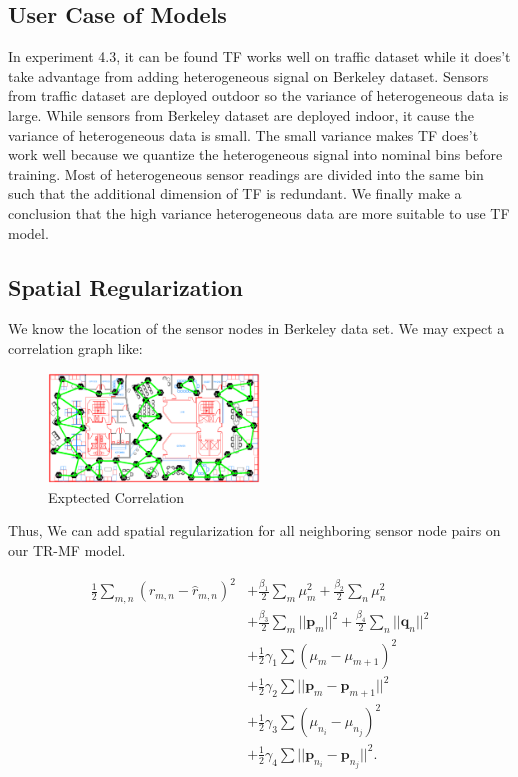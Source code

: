 \subsection{User Case of Models}


In experiment 4.3, it can be found TF works well on traffic dataset while it does't take advantage from adding heterogeneous signal on Berkeley dataset.
Sensors from traffic dataset are deployed outdoor so the variance of heterogeneous data is large.
While sensors from Berkeley dataset are deployed indoor, it cause the variance of heterogeneous data is small.
The small variance makes TF does't work well because we quantize the heterogeneous signal into nominal bins before training.
Most of heterogeneous sensor readings are divided into the same bin such that the additional dimension of TF is redundant.
We finally make a conclusion that the high variance heterogeneous data are more suitable to use TF model.

\subsection{Spatial Regularization}
We know the location of the sensor nodes in Berkeley data set. We may expect a correlation graph like:
\begin{figure}[htbp]
	\centering
	\includegraphics[width=0.5\textwidth]{expected.png}
	\caption{Exptected Correlation}
\end{figure}

Thus, We can add spatial regularization for all neighboring sensor node pairs on our TR-MF model. 

\begin{equation*}\begin{aligned}
\frac{1}{2}\sum_{m,n}{(r_{m,n} - \hat{r}_{m,n})}^2 &+ \frac{\beta_1}{2}\sum_m{\mu_m^2} + \frac{\beta_2}{2}\sum_n{\mu_n^2}\\
&+ \frac{\beta_3}{2}\sum_m{||\mathbf{p}_m||^2} + \frac{\beta_4}{2}\sum_n{||\mathbf{q}_n||^2}\\ 
&+ \frac{1}{2}\gamma_1\sum{(\mu_m-\mu_{m+1})^2}\\ 
&+ \frac{1}{2}\gamma_2\sum{||\mathbf{p}_m-\mathbf{p}_{m+1}||^2}\\
&+ \frac{1}{2}\gamma_3\sum{(\mu_{n_i}-\mu_{n_j})^2} \\
&+ \frac{1}{2}\gamma_4\sum{||\mathbf{p}_{n_i}-\mathbf{p}_{n_j}||^2}.\\
\end{aligned}\end{equation*}


